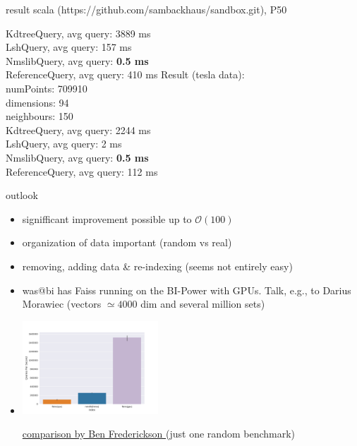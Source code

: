 \documentclass[xcolor=dvipsnames, aspectratio=1610]{beamer}
\newcommand{\alertA}[1]{\color{alertAcolor}#1\color{Black}}
\newcommand{\alertB}[1]{{\color{AlertcolB}#1}}
\newcommand{\gr}[1]{{\color{grcol}#1}}
\newcommand{\citeWork}[1]{ {\scriptsize{\color{Refcol} #1  \color{Black}}}}
\begin{document}
\begin{frame}[fragile]{result scala (https://github.com/sambackhaus/sandbox.git), P50}
{\begin{minipage}{0.40\textwidth}
\begin{flushleft}
KdtreeQuery, avg query: 3889 ms\\
LshQuery, avg query: 157 ms\\
NmslibQuery, avg query: {\alertA{\bf{ 0.5 ms}}} \\
ReferenceQuery, avg query: 410 ms
\vspace{0.2cm}
Result (tesla data):\\
numPoints: 709910\\
dimensions: 94\\
neighbours: 150\\

KdtreeQuery, avg query: 2244 ms\\
LshQuery, avg query: 2 ms\\
NmslibQuery, avg query: {\alertA{\bf{0.5 ms}}}\\
ReferenceQuery, avg query: 112 ms\\
\end{flushleft}
\end{minipage}
}
\end{frame}



\begin{frame}{outlook } 
\linespread{1}\small{
\begin{minipage}{0.99\textwidth}  

\begin{itemize}
\item signifficant improvement possible up to \alertA{$\mathcal O (100)$}
\item organization of data important \alertA{(random vs real)}
\item removing, adding data \& re-indexing \alertB{(seems not entirely easy)}
\item was@bi has Faiss running on the BI-Power with GPUs. Talk, e.g., to \alertB{Darius Morawiec} (vectors $\simeq 4000$ dim and several million sets)
\item \includegraphics[width=0.4\textwidth]{Figures/faiss_gpu.png} 

\href{https://www.benfrederickson.com/approximate-nearest-neighbours-for-recommender-systems/}{\citeWork{comparison by Ben Frederickson}} \gr{(just one random benchmark)}
\end{itemize}
\end{minipage}
}
\end{frame}
\end{document}
